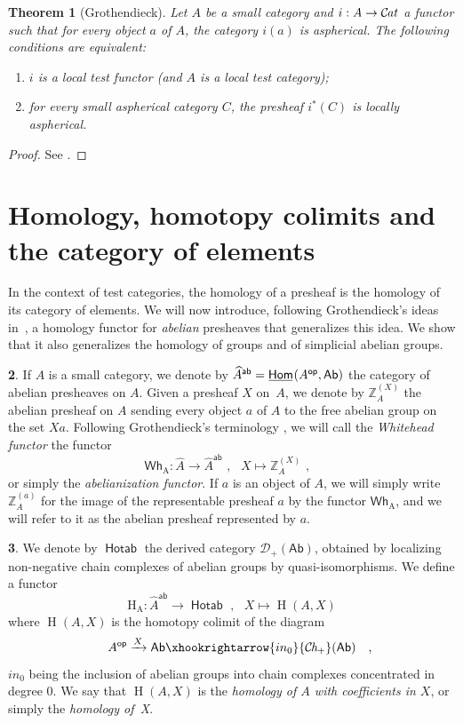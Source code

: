 \documentclass[10pt, english, a4paper, nothms]{amsart}
\theoremstyle{plain}
\newtheorem{theorem}{Theorem}[section]
\theoremstyle{remark}
\theoremstyle{definition}
\newtheorem{paragr}[theorem]{}
\numberwithin{equation}{theorem}
\newcommand\Z{\mathbb{Z}}
\newcommand{\Cat}{{\mathcal{C}\mspace{-2.mu}\it{at}}}
\newcommand{\Ch}{{\mathcal{C}\mspace{-2.mu}\it{h}_{+}}}
\newcommand{\Homi}{\operatorname{\kern.5truept\underline{\kern-.5truept\mathsf{Hom}\kern-.5truept}\kern1truept}}
\DeclareMathOperator{\op}{\mathsf{op}}
\newcommand{\pref}[1]{{\widehat{ #1 }}}
\newcommand{\Hotab}{\operatorname{\mathsf{Hotab}}}
\newcommand{\Ab}{{\mathsf{Ab}}}
\newcommand{\Wh}[2]{\Z_{#1}^{\left(#2\right)}}
\newcommand{\Whf}[1]{\operatorname{\mathsf{Wh}_{#1}}}
\renewcommand{\H}[2]{\operatorname{{H}}(#1,#2)}
\newcommand{\Hf}[1]{\operatorname{H_{#1}}}
\newcommand{\prefab}[1]{\widehat{ #1 }^{\mathsf{ab}}}
\newcommand{\mdvirg}{\text{ ,}\hspace{10pt}}
\newcommand\zbox[1]{\makebox[0pt][l]{#1}}
\newcommand\pbox[1]{\zbox{\quad #1}} %
\begin{document}
\begin{theorem}[Grothendieck]
\label{thm:EquivalencesFoncteursTestLocal}
Let $A$ be a small category and $i:A \to \Cat$ a functor such that for
every object $a$ of $A$, the category $i(a)$ is aspherical. The
following conditions are equivalent:
\begin{enumerate}
\item $i$ is a local test functor (and $A$ is a local test category);
\item  for every small aspherical category $C$, the presheaf $i^*(C)$
is locally aspherical.
\end{enumerate}
\end{theorem}
\begin{proof}
See \cite[Theorem 1.7.13]{maltsiniotis2005}.
\end{proof}


\section{Homology, homotopy colimits and the category of elements} 
\label{sec:homology}

In the context of test categories, the homology of a presheaf is the homology of
its category of elements. 
We will now introduce, following Grothendieck's ideas in~\cite{pursuingstacks},
a homology functor for \emph{abelian} presheaves that generalizes this idea. We
show that it also generalizes the homology of groups and of simplicial abelian
groups.

\begin{paragr}
If $A$ is a small category, we denote by $\prefab{A} =
\Homi({A}^{\op},\Ab)$ the category of abelian presheaves on $A$. Given a
presheaf $X$ on~$A$, we denote by $\Wh{A}{X}$ the abelian presheaf on $A$
sending every object $a$ of $A$ to the free abelian group on the set $Xa$.
Following Grothendieck's terminology \cite{pursuingstacks}, we will call the
\emph{Whitehead functor} the functor 
\[
\Whf{A}: \pref{A}\to\prefab{A} \mdvirg X \mapsto \Wh{A}{X} \mdvirg
\]
or simply the \emph{abelianization functor}.
If $a$ is an object of $A$, we will simply write $\Wh{A}{a}$ for the image of
the representable presheaf $a$ by the functor $\Whf{A}$, and we will refer to it
as the abelian presheaf represented by $a$.
\end{paragr}

\begin{paragr}\label{paragr:HomologyFunctor}
We denote by $\Hotab$ the derived category $\mathcal{D}_+(\Ab)$, obtained by
localizing non-negative chain complexes of abelian groups by quasi-isomorphisms.
We define a functor 
\[
\Hf{A}: \prefab{A} \to \Hotab \mdvirg X \mapsto \H{A}{X}
\]
where $\H{A}{X}$ is the homotopy colimit of the diagram 
\[
{A}^{\op} \xrightarrow{X} \Ab \xhookrightarrow{in_0} \Ch(\Ab) \pbox{,}
\]
$in_0$ being the inclusion of abelian groups into chain complexes
concentrated in degree $0$.
We say that $\H{A}{X}$ is the \emph{homology of $A$ with coefficients in $X$},
or simply the \emph{homology of~X}.
\end{paragr}
\end{document}
